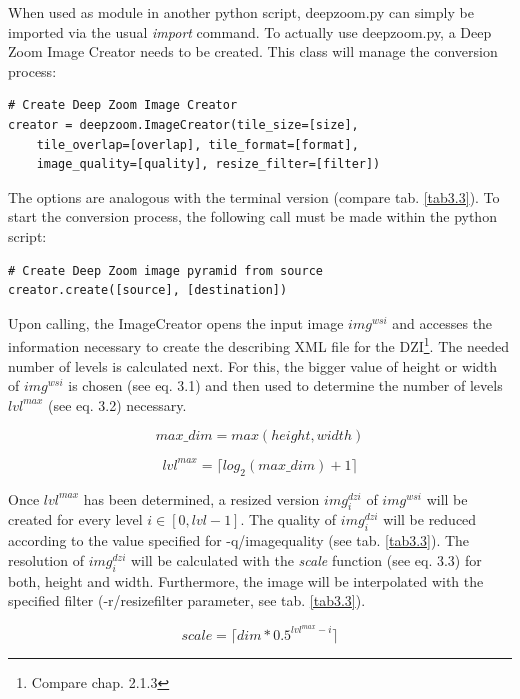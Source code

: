 When used as module in another python script, deepzoom.py can simply be imported via the usual \emph{import} command. To actually use deepzoom.py, a Deep Zoom Image Creator needs to be created. This class will manage the conversion process:

\begin{lstlisting}[frame=single]
# Create Deep Zoom Image Creator
creator = deepzoom.ImageCreator(tile_size=[size], 
	tile_overlap=[overlap],	tile_format=[format], 
	image_quality=[quality], resize_filter=[filter])
\end{lstlisting}

The options are analogous with the terminal version (compare tab. \ref{tab3.3}). To start the conversion process, the following call must be made within the python script:

\begin{lstlisting}[frame=single]
# Create Deep Zoom image pyramid from source
creator.create([source], [destination])
\end{lstlisting}

Upon calling, the ImageCreator opens the input image $img^{wsi}$ and accesses the information necessary to create the describing XML file for the DZI\footnote{Compare chap. 2.1.3}. The needed number of levels is calculated next. For this, the bigger value of height or width of $img^{wsi}$ is chosen (see eq. 3.1) and then used to determine the number of levels $lvl^{max}$ (see eq. 3.2) necessary.

\begin{equation}
	max{\_}dim = max(height, width)
\end{equation}

\begin{equation}
	lvl^{max} = {\lceil}log_2(max{\_}dim) + 1\rceil
\end{equation}

Once $lvl^{max}$ has been determined, a resized version $img^{dzi}_i$ of $img^{wsi}$ will be created for every level $i \in [0, lvl-1]$. The quality of $img^{dzi}_i$ will be reduced according to the value specified for -q/image{\textunderscore}quality (see tab. \ref{tab3.3}). The resolution of $img^{dzi}_i$ will be calculated with the \emph{scale} function (see eq. 3.3) for both, height and width. Furthermore, the image will be interpolated with the specified filter (-r/resize{\textunderscore}filter parameter, see tab. \ref{tab3.3}).

\begin{equation}
	scale = {\lceil}dim * 0.5^{lvl^{max}-i}\rceil
\end{equation}

